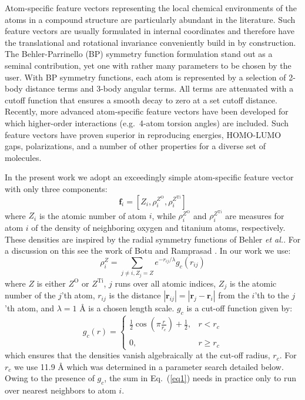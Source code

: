 \documentclass[aip,amsmath,amssymb,reprint]{revtex4-1}
\begin{document}
Atom-specific feature vectors representing the local
chemical environments of the atoms in a compound structure are
particularly abundant in the literature. Such feature vectors are usually
formulated in internal coordinates and therefore have the translational
and rotational invariance conveniently build in by construction. The Behler-Parrinello (BP)
symmetry function formulation\cite{behler_parrinello} stand out as a seminal
contribution, yet one with rather many parameters to be chosen by the
user. With BP symmetry functions, each atom is represented by a selection
of 2-body distance terms and 3-body angular terms. All terms are
attenuated with a cutoff function that ensures a smooth decay to
zero at a set cutoff distance.  Recently, more advanced atom-specific feature vectors
have been developed for which higher-order interactions (e.g.\ 4-atom torsion angles) are included.
Such feature vectors have proven superior in reproducing energies,
HOMO-LUMO gaps, polarizations, and a number of other properties for a
diverse set of molecules.\cite{baml,dihedral_representation}

In the present work we adopt an exceedingly simple atom-specific
feature vector with only three components:
\begin{equation}
\mathbf{f}_i=\left[Z_i,\rho_i^{Z^\mathrm{O}},\rho_i^{Z^\mathrm{Ti}}\right]\label{eq_feature}
\end{equation}
where $Z_i$ is the atomic number of atom $i$, while
$\rho_i^{Z^\mathrm{O}}$ and $\rho_i^{Z^\mathrm{Ti}}$ are measures for
atom $i$ of the density of neighboring oxygen and titanium atoms,
respectively. These densities are inspired by the radial symmetry
functions of Behler \textit{et al.}\cite{behler_parrinello}. For a discussion on this see the work of Botu
and Ramprasad \cite{Botu2015}. In our work we use:
\begin{equation}
\rho_i^Z = \sum_{j\ne i,Z_j=Z} e^{-r_{ij}/\lambda}g_c(r_{ij})  \label{eq1}
\end{equation}
where $Z$ is either $Z^\mathrm{O}$ or $Z^\mathrm{Ti}$, $j$ runs over
all atomic indices, $Z_j$ is the atomic number of the $j$'th atom, $r_{ij}$ is the distance $|\mathbf r_{ij}|=|\mathbf r_j-
\mathbf r_i|$ from the $i$'th to the $j$'th atom, and
$\lambda=1$ {\AA} is a chosen length scale. $g_c$ is a cut-off
function given by:
\begin{equation}
g_c(r)=
\left\{\begin{array}{ll}
\frac{1}{2}{\cos(\pi \frac{r}{r_c})+\frac{1}{2}},&r<r_c\\
\\
0,&r\ge r_c
\end{array}
\right.
\end{equation}
which ensures that the densities vanish algebraically at the cut-off
radius, $r_c$. For $r_c$ we use 11.9 {\AA} which was determined in a parameter search detailed below.
Owing to the presence of $g_c$, the sum in Eq.\ (\ref{eq1}) needs
in practice only to run over nearest neighbors to atom $i$.
\end{document}
